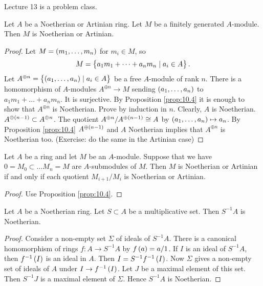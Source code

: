 Lecture 13 is a problem class.


\begin{corollary}
Let $ A $ be a Noetherian or Artinian ring. Let $ M $ be a finitely generated $ A $-module. Then $ M $ is Noetherian or Artinian.
\end{corollary}

\begin{proof}
Let $ M = \br{m_1, \dots, m_n} $ for $ m_i \in M $, so
$$ M = \cbr{a_1m_1 + \dots + a_nm_n \mid a_i \in A}. $$
Let $ A^{\oplus n} = \cbr{\br{a_1, \dots, a_n} \mid a_i \in A} $ be a free $ A $-module of rank $ n $. There is a homomorphism of $ A $-modules $ A^{\oplus n} \to M $ sending $ \br{a_1, \dots, a_n} $ to $ a_1m_1 + \dots + a_nm_n $. It is surjective. By Proposition \ref{prop:10.4} it is enough to show that $ A^{\oplus n} $ is Noetherian. Prove by induction in $ n $. Clearly, $ A $ is Noetherian. $ A^{\oplus \br{n - 1}} \subset A^{\oplus n} $. The quotient $ A^{\oplus n} / A^{\oplus \br{n - 1}} \cong A $ by $ \br{a_1, \dots, a_n} \mapsto a_n $. By Proposition \ref{prop:10.4} $ A^{\oplus \br{n - 1}} $ and $ A $ Noetherian implies that $ A^{\oplus n} $ is Noetherian too. (Exercise: do the same in the Artinian case)
\end{proof}

\begin{corollary}
\label{cor:10.6}
Let $ A $ be a ring and let $ M $ be an $ A $-module. Suppose that we have $ 0 = M_0 \subset \dots M_n = M $ are $ A $-submodules of $ M $. Then $ M $ is Noetherian or Artinian if and only if each quotient $ M_{i + 1} / M_i $ is Noetherian or Artinian.
\end{corollary}

\begin{proof}
Use Proposition \ref{prop:10.4}.
\end{proof}

\begin{lemma}
Let $ A $ be a Noetherian ring. Let $ S \subset A $ be a multiplicative set. Then $ S^{-1}A $ is Noetherian.
\end{lemma}

\begin{proof}
Consider a non-empty set $ \Sigma $ of ideals of $ S^{-1}A $. There is a canonical homomorphism of rings $ f : A \to S^{-1}A $ by $ f\br{a} = a / 1 $. If $ I $ is an ideal of $ S^{-1}A $, then $ f^{-1}\br{I} $ is an ideal in $ A $. Then $ I = S^{-1}f^{-1}\br{I} $. Now $ \Sigma $ gives a non-empty set of ideals of $ A $ under $ I \to f^{-1}\br{I} $. Let $ J $ be a maximal element of this set. Then $ S^{-1}J $ is a maximal element of $ \Sigma $. Hence $ S^{-1}A $ is Noetherian.
\end{proof}

